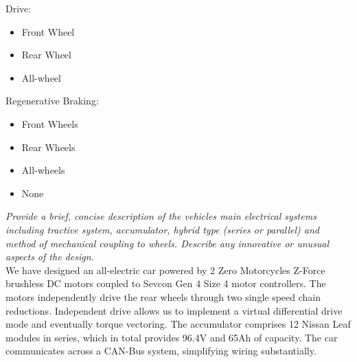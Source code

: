 \documentclass{article}
\begin{document}
    \par{Drive:}
    \begin{itemize}
        \item \makebox[0pt][l]{$\square$}\raisebox{.15ex}{\hspace{0.1em}} \hspace{0.2cm} Front Wheel
        \item \makebox[0pt][l]{$\square$}\raisebox{.15ex}{\hspace{0.1em}$\checkmark$} \hspace{0.2cm} Rear Wheel
        \item \makebox[0pt][l]{$\square$}\raisebox{.15ex}{\hspace{0.1em}} \hspace{0.2cm} All-wheel
    \end{itemize}

    \par{Regenerative Braking:}
    \begin{itemize}
        \item \makebox[0pt][l]{$\square$}\raisebox{.15ex}{\hspace{0.1em}} \hspace{0.2cm} Front Wheels
        \item \makebox[0pt][l]{$\square$}\raisebox{.15ex}{\hspace{0.1em}$\checkmark$} \hspace{0.2cm} Rear Wheels
        \item \makebox[0pt][l]{$\square$}\raisebox{.15ex}{\hspace{0.1em}} \hspace{0.2cm} All-wheels
        \item \makebox[0pt][l]{$\square$}\raisebox{.15ex}{\hspace{0.1em}} \hspace{0.2cm} None
    \end{itemize}

\newpage

        \textit{Provide a brief, concise description of the vehicles main electrical systems including tractive system, accumulator, hybrid type (series or parallel) and method of mechanical coupling to wheels. Describe any innovative or unusual aspects of the design.}\\

        We have designed an all-electric car powered by 2 Zero Motorcycles Z-Force brushless DC motors coupled to Sevcon Gen 4 Size 4 motor controllers. The motors independently drive the rear wheels through two single speed chain reductions. Independent drive allows us to implement a virtual differential drive mode and eventually torque vectoring. The accumulator comprises 12 Nissan Leaf modules in series, which in total provides 96.4V and 65Ah of capacity. The car communicates across a CAN-Bus system, simplifying wiring substantially.\\
\end{document}
